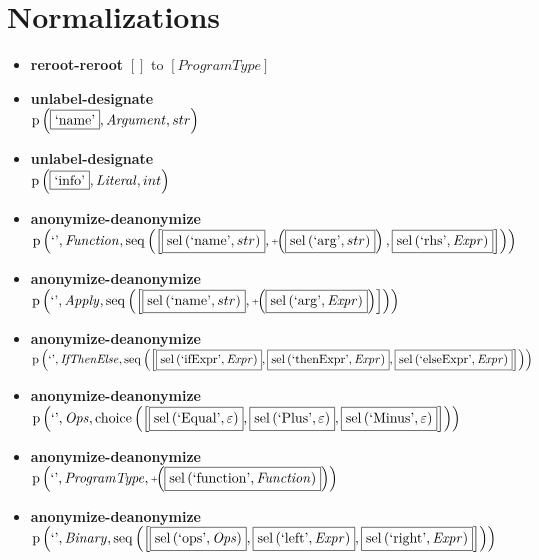 \section{Normalizations}
{\footnotesize\begin{itemize}
\item \textbf{reroot-reroot} $\left[\right]$ to $\left[\mathit{ProgramType}\right]$
\item \textbf{unlabel-designate}\\$\mathrm{p}\left(\fbox{\text{`name'}},\mathit{Argument},str\right)$
\item \textbf{unlabel-designate}\\$\mathrm{p}\left(\fbox{\text{`info'}},\mathit{Literal},int\right)$
\item \textbf{anonymize-deanonymize}\\$\mathrm{p}\left(\text{`'},\mathit{Function},\mathrm{seq}\left(\left[\fbox{$\mathrm{sel}\left(\text{`name'},str\right)$}, \plus \left(\fbox{$\mathrm{sel}\left(\text{`arg'},str\right)$}\right), \fbox{$\mathrm{sel}\left(\text{`rhs'},\mathit{Expr}\right)$}\right]\right)\right)$
\item \textbf{anonymize-deanonymize}\\$\mathrm{p}\left(\text{`'},\mathit{Apply},\mathrm{seq}\left(\left[\fbox{$\mathrm{sel}\left(\text{`name'},str\right)$}, \plus \left(\fbox{$\mathrm{sel}\left(\text{`arg'},\mathit{Expr}\right)$}\right)\right]\right)\right)$
\item \textbf{anonymize-deanonymize}\\$\mathrm{p}\left(\text{`'},\mathit{IfThenElse},\mathrm{seq}\left(\left[\fbox{$\mathrm{sel}\left(\text{`ifExpr'},\mathit{Expr}\right)$}, \fbox{$\mathrm{sel}\left(\text{`thenExpr'},\mathit{Expr}\right)$}, \fbox{$\mathrm{sel}\left(\text{`elseExpr'},\mathit{Expr}\right)$}\right]\right)\right)$
\item \textbf{anonymize-deanonymize}\\$\mathrm{p}\left(\text{`'},\mathit{Ops},\mathrm{choice}\left(\left[\fbox{$\mathrm{sel}\left(\text{`Equal'},\varepsilon\right)$}, \fbox{$\mathrm{sel}\left(\text{`Plus'},\varepsilon\right)$}, \fbox{$\mathrm{sel}\left(\text{`Minus'},\varepsilon\right)$}\right]\right)\right)$
\item \textbf{anonymize-deanonymize}\\$\mathrm{p}\left(\text{`'},\mathit{ProgramType},\plus \left(\fbox{$\mathrm{sel}\left(\text{`function'},\mathit{Function}\right)$}\right)\right)$
\item \textbf{anonymize-deanonymize}\\$\mathrm{p}\left(\text{`'},\mathit{Binary},\mathrm{seq}\left(\left[\fbox{$\mathrm{sel}\left(\text{`ops'},\mathit{Ops}\right)$}, \fbox{$\mathrm{sel}\left(\text{`left'},\mathit{Expr}\right)$}, \fbox{$\mathrm{sel}\left(\text{`right'},\mathit{Expr}\right)$}\right]\right)\right)$

\end{itemize}}
